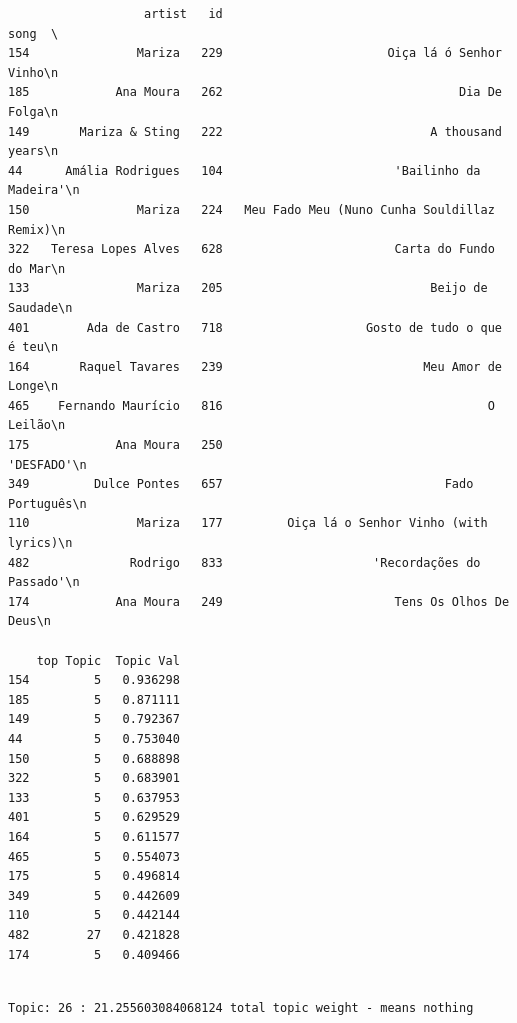\documentclass[11pt]{article}
\begin{document}
    
    \begin{verbatim}
                   artist   id                                           song  \
154               Mariza   229                       Oiça lá ó Senhor Vinho\n   
185            Ana Moura   262                                 Dia De Folga\n   
149       Mariza & Sting   222                             A thousand years\n   
44      Amália Rodrigues   104                        'Bailinho da Madeira'\n   
150               Mariza   224   Meu Fado Meu (Nuno Cunha Souldillaz Remix)\n   
322   Teresa Lopes Alves   628                        Carta do Fundo do Mar\n   
133               Mariza   205                             Beijo de Saudade\n   
401        Ada de Castro   718                    Gosto de tudo o que é teu\n   
164       Raquel Tavares   239                            Meu Amor de Longe\n   
465    Fernando Maurício   816                                     O Leilão\n   
175            Ana Moura   250                                    'DESFADO'\n   
349         Dulce Pontes   657                               Fado Português\n   
110               Mariza   177         Oiça lá o Senhor Vinho (with lyrics)\n   
482              Rodrigo   833                     'Recordações do Passado'\n   
174            Ana Moura   249                        Tens Os Olhos De Deus\n   

    top Topic  Topic Val  
154         5   0.936298  
185         5   0.871111  
149         5   0.792367  
44          5   0.753040  
150         5   0.688898  
322         5   0.683901  
133         5   0.637953  
401         5   0.629529  
164         5   0.611577  
465         5   0.554073  
175         5   0.496814  
349         5   0.442609  
110         5   0.442144  
482        27   0.421828  
174         5   0.409466  
    \end{verbatim}

    
    \begin{Verbatim}[commandchars=\\\{\}]

Topic: 26 : 21.255603084068124 total topic weight - means nothing

    \end{Verbatim}
\end{document}
